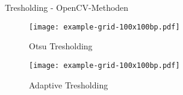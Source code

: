 \documentclass[xcolor=dvipsnames]{beamer}
\begin{document}
\begin{frame}{Tresholding - OpenCV-Methoden}

\centering
\begin{minipage}{.5\textwidth}
    \centering
    \begin{figure}
        \texttt{[image: example-grid-100x100bp.pdf]}
        \vspace*{-0.3cm}
        \caption{Otsu Tresholding}
    \end{figure}
\end{minipage}%
\begin{minipage}{.5\textwidth}
    \centering
    \begin{figure}
        \texttt{[image: example-grid-100x100bp.pdf]}
        \vspace*{-0.3cm}
        \caption{Adaptive Tresholding}
    \end{figure}
\end{minipage}

\end{frame}
\end{document}
